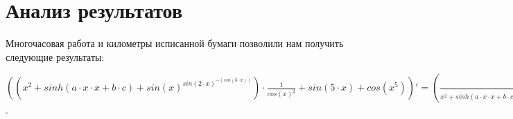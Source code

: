 \documentclass{article}
\begin{document}
\section{ Анализ результатов }
Многочасовая работа и километры исписанной бумаги позволили нам получить следующие результаты:\\
\begin{center}$(({x^{{2}}}+sinh(a \cdot x \cdot x+b \cdot c)+{sin(x)^{sin({2} \cdot x)^{-(sin({3} \cdot x))}}}) \cdot  \frac {1} {{{cos(x)^{{2}}}}}+sin({5} \cdot x)+cos({x^{{5}}}))'= ( \frac {1} {{{x^{{2}}}+sinh(a \cdot x \cdot x+b \cdot c)+{sin(x)^{sin({2} \cdot x)^{-(sin({3} \cdot x))}}}}} \cdot ({x^{{2}}} \cdot ({1} \cdot  \frac {1} {{x}} \cdot {{2}}+log(x) \cdot {0})+cosh(a \cdot x \cdot x+b \cdot c) \cdot (( \frac {1} {{a}} \cdot {0}+ \frac {1} {{x}} \cdot {1}+ \frac {1} {{x}} \cdot {1}) \cdot a \cdot x \cdot x+( \frac {1} {{b}} \cdot {0}+ \frac {1} {{c}} \cdot {0}) \cdot b \cdot c)+{sin(x)^{sin({2} \cdot x)^{-(sin({3} \cdot x))}}} \cdot (cos(x) \cdot {1} \cdot  \frac {1} {{sin(x)}} \cdot  \frac {1} {{sin({2} \cdot x)} ^ {sin({3} \cdot x)}}+log(sin(x)) \cdot  \frac {1} {{sin({2} \cdot x)} ^ {sin({3} \cdot x)}} \cdot (cos({2} \cdot x) \cdot ( \frac {1} {{{2}}} \cdot {0}+ \frac {1} {{x}} \cdot {1}) \cdot {2} \cdot x \cdot  \frac {1} {{sin({2} \cdot x)}} \cdot {-(sin({3} \cdot x))}+log(sin({2} \cdot x)) \cdot -(cos({3} \cdot x) \cdot ( \frac {1} {{{3}}} \cdot {0}+ \frac {1} {{x}} \cdot {1}) \cdot {3} \cdot x))))+ \frac {1} {{ \frac {1} {{{cos(x)^{{2}}}}}}} \cdot  \frac {1} {{{cos(x)^{{2}}}}} \cdot ({cos(x)^{{2}}} \cdot (-(sin(x)) \cdot {1} \cdot  \frac {1} {{cos(x)}} \cdot {{2}}+log(cos(x)) \cdot {0}) \cdot  \frac {1} {{{cos(x)^{{2}}}}} \cdot {{-1}}+log({cos(x)^{{2}}}) \cdot {0})) \cdot ({x^{{2}}}+sinh(a \cdot x \cdot x+b \cdot c)+{sin(x)^{sin({2} \cdot x)^{-(sin({3} \cdot x))}}}) \cdot  \frac {1} {{{cos(x)^{{2}}}}}+cos({5} \cdot x) \cdot ( \frac {1} {{{5}}} \cdot {0}+ \frac {1} {{x}} \cdot {1}) \cdot {5} \cdot x+-(sin({x^{{5}}})) \cdot {x^{{5}}} \cdot ({1} \cdot  \frac {1} {{x}} \cdot {{5}}+log(x) \cdot {0})$.\end{center}
\end{document}
